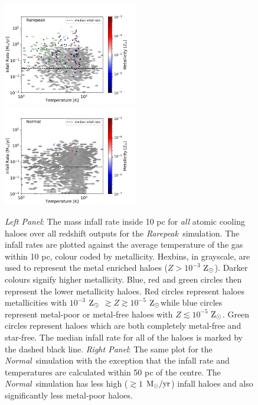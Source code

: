\documentclass[graphics, twocolumn, usenatbib]{mn2e}
\newcommand{\msolaryrc} {$\rm{M_{\odot}/yr}$}
\newcommand{\zsolar} {$\rm{Z_{\odot}}~$}
\newcommand{\zsolarc} {$\rm{Z_{\odot}}$}
\newcommand{\rarepeak} {\textit{Rarepeak~}}
\newcommand{\normal} {\textit{Normal~}}
\begin{document}
\begin{figure}
\centering
\begin{minipage}{175mm}      \begin{center} 
\centerline{
\includegraphics[width=0.525\textwidth]{FIGURES/Rarepeak_MdotTZ.png}
\includegraphics[width=0.525\textwidth]{FIGURES/Normal_MdotTZ.png}}
\caption{\textit{Left Panel}: The mass infall rate inside 10 pc for \textit{all} atomic
  cooling haloes over all redshift outputs for the \rarepeak simulation. The infall rates are plotted
  against the average temperature of the gas within 10 pc, colour coded by metallicity. Hexbins, in
  grayscale, are used to represent the metal enriched haloes ($Z > 10^{-3}$ \zsolarc). Darker colours
  signify higher metallicity. Blue, red and green circles then represent the lower metallicity
  haloes. Red circles represent haloes metallicities with $10^{-3} $ \zsolar $\gtrsim
  Z \gtrsim 10^{-5}$ \zsolarc while blue circles represent metal-poor or metal-free
   haloes with $Z \lesssim 10^{-5}$ \zsolarc. Green circles represent haloes which are both
   completely metal-free and star-free. The median infall rate for all of the haloes is marked
   by the dashed black line. \textit{Right Panel}: The same plot for the \normal simulation with
   the exception that the infall rate and temperatures are calculated within 50 pc of the centre.
   The \normal simulation has less high ($ \gtrsim 1 $ \msolaryrc) infall haloes and also
   significantly less metal-poor haloes.} \label{Fig:Scatter}
\end{center} \end{minipage}

\end{figure}
\end{document}
